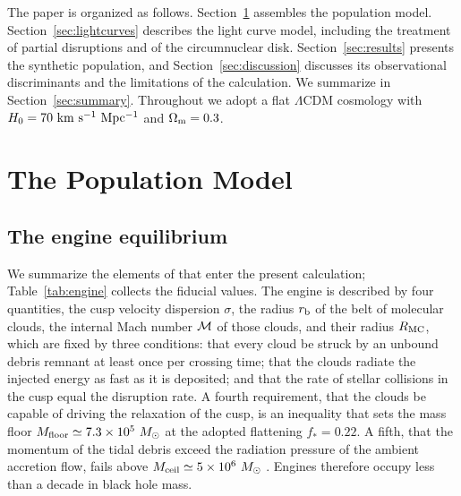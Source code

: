 \documentclass[twocolumn,pdftex]{aastex701}
\newcommand{\msun}{M_{\odot}\xspace}
\newcommand{\rb}{r_{\rm b}\xspace}
\begin{document}
The paper is organized as follows. Section~\ref{sec:population} assembles the population model. Section~\ref{sec:lightcurves} describes the light curve model, including the treatment of partial disruptions and of the circumnuclear disk. Section~\ref{sec:results} presents the synthetic population, and Section~\ref{sec:discussion} discusses its observational discriminants and the limitations of the calculation. We summarize in Section~\ref{sec:summary}. Throughout we adopt a flat $\Lambda$CDM cosmology with $H_{0} = 70~{\rm km~s^{-1}~Mpc^{-1}}$ and $\Omega_{\rm m} = 0.3$.

\section{The Population Model}\label{sec:population}

\subsection{The engine equilibrium}\label{subsec:recap}

We summarize the elements of \citet{Guillochon:2026a} that enter the present calculation; Table~\ref{tab:engine} collects the fiducial values. The engine is described by four quantities, the cusp velocity dispersion $\sigma$, the radius $\rb$ of the belt of molecular clouds, the internal Mach number ${\cal M}$ of those clouds, and their radius $R_{\rm MC}$, which are fixed by three conditions: that every cloud be struck by an unbound debris remnant at least once per crossing time; that the clouds radiate the injected energy as fast as it is deposited; and that the rate of stellar collisions in the cusp equal the disruption rate. A fourth requirement, that the clouds be capable of driving the relaxation of the cusp, is an inequality that sets the mass floor $M_{\rm floor} \simeq 7.3 \times 10^{5}~\msun$ at the adopted flattening $f_{\ast} = 0.22$. A fifth, that the momentum of the tidal debris exceed the radiation pressure of the ambient accretion flow, fails above $M_{\rm ceil} \simeq 5 \times 10^{6}~\msun$ \citep[Figure~3 of][]{Guillochon:2026a}. Engines therefore occupy less than a decade in black hole mass.
\end{document}
